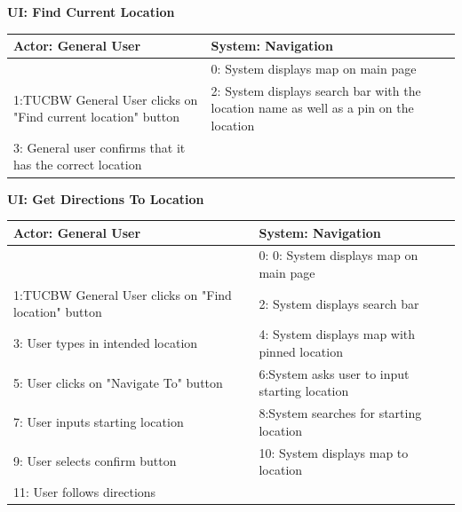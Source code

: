 \documentclass{article}
\begin{document}
	{
	\begin{center}
\textbf{UI: Find Current Location}
\begin{tabular}{ |p{7cm}|p{7cm}| } 
 \hline
 Actor: General User & System: Navigation\\ 
\hline \hline
 & 0: System displays map on main page\\ 
\hline
 1:TUCBW General User clicks on "Find current location" button & 2: System displays search bar with the location name as well as a pin on the location \\ 
\hline
3: General user confirms that it has the correct location & \\
 \hline
\end{tabular}
\end{center}


\begin{center}
\textbf{UI: Get Directions To Location}
\begin{tabular}{  |p{7cm}|p{7cm}| } 
 \hline
 Actor: General User & System: Navigation\\ 
\hline \hline
 & 0: 0: System displays map on main page\\ 
\hline
 1:TUCBW General User clicks on "Find location" button & 2: System displays search bar \\ 
\hline
3: User types in intended location & 4: System displays map with pinned location \\
 \hline
5: User clicks on "Navigate To" button & 6:System asks user to input starting location \\
 \hline
7: User inputs starting location & 8:System searches for starting location \\
 \hline
9: User selects confirm button & 10: System displays map to location \\
 \hline
11: User follows directions &  \\
 \hline
\end{tabular}
\end{center}
	
}
\end{document}
